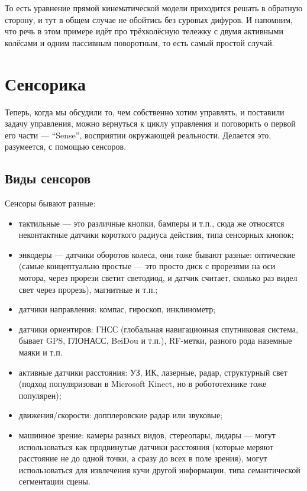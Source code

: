 \documentclass{../../text-style}
\begin{document}
То есть уравнение прямой кинематической модели приходится решать в обратную сторону, и тут в общем случае не обойтись без суровых дифуров. И напомним, что речь в этом примере идёт про трёхколёсную тележку с двумя активными колёсами и одним пассивным поворотным, то есть самый простой случай.

\section{Сенсорика}

Теперь, когда мы обсудили то, чем собственно хотим управлять, и поставили задачу управления, можно вернуться к циклу управления и поговорить о первой его части --- \enquote{Sense}, восприятии окружающей реальности. Делается это, разумеется, с помощью сенсоров.

\subsection{Виды сенсоров}

Сенсоры бывают разные:

\begin{itemize}
    \item тактильные --- это различные кнопки, бамперы и т.п., сюда же относятся неконтактные датчики короткого радиуса действия, типа сенсорных кнопок;
    \item энкодеры --- датчики оборотов колеса, они тоже бывают разные: оптические (самые концептуально простые --- это просто диск с прорезями на оси мотора, через прорези светит светодиод, и датчик считает, сколько раз видел свет через прорезь), магнитные и т.п.;
    \item датчики направления: компас, гироскоп, инклинометр;
    \item датчики ориентиров: ГНСС (глобальная навигационная спутниковая система, бывает GPS, ГЛОНАСС, BeiDou и т.п.), RF-метки, разного рода наземные маяки и т.п.
    \item активные датчики расстояния: УЗ, ИК, лазерные, радар, структурный свет (подход популяризован в Microsoft Kinect, но в робототехнике тоже популярен);
    \item движения/скорости: допплеровские радар или звуковые;
    \item машинное зрение: камеры разных видов, стереопары, лидары --- могут использоваться как продвинутые датчики расстояния (которые меряют расстояние не до одной точки, а сразу до всех в поле зрения), могут использоваться для извлечения кучи другой информации, типа семантической сегментации сцены.
\end{itemize}
\end{document}
